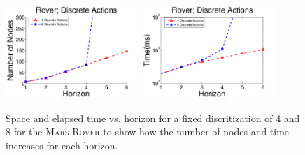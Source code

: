 \documentclass[twoside,11pt]{article}
\newcommand{\MarsRover}{\textsc{Mars Rover }}
\begin{document}
\begin{figure}[tbp!]
\vspace{2mm}
\centering
\includegraphics[width=0.45\textwidth]{Figures2/camdp/DisRoverNode.pdf}
\includegraphics[width=0.45\textwidth]{Figures2/camdp/DisRoverTime.pdf}
\vspace{-2mm}
\caption{%
Space and elapsed time vs. horizon for a fixed discritization of 4 and 8 for the \MarsRover to show how the number of nodes and time increases for each horizon. 
}
\label{fig:roverDisTS}
\vspace{-5mm}
\end{figure}
\end{document}
